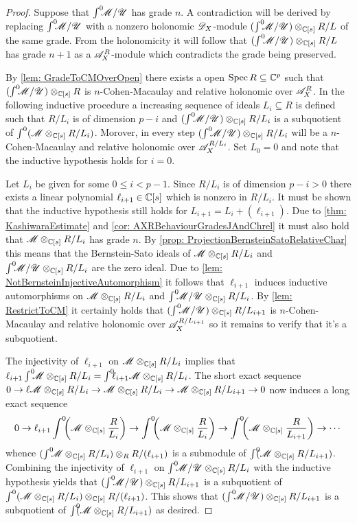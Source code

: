 \begin{proof}
  Suppose that $\int^0 \mkern -8mu\mathscr{M}/\mathscr{U}$ has grade $n$. A contradiction will be derived by replacing $\int^0 \mkern -8mu\mathscr{M}/\mathscr{U}$ with a nonzero holonomic $\mathscr{D}_X$-module $(\int^0 \mkern -8mu\mathscr{M}/\mathscr{U})\otimes_{\mathbb{C}[s]} R/L$ of the same grade. From the holonomicity it will follow that $(\int^0 \mkern -8mu\mathscr{M}/ \mathscr{U})\otimes_{\mathbb{C}[s]} R/L$ has grade $n+1$ as a $\mathscr{A}_X^R$-module which contradicts the grade being preserved.

  By \cref{lem: GradeToCMOverOpen} there exists a open $\operatorname{Spec} R\subseteq \mathbb{C}^p$ such that $(\int^0 \mkern -8mu\mathscr{M}/\mathscr{U})\otimes_{\mathbb{C}[s]}R$ is $n$-Cohen-Macaulay and relative holonomic over $\mathscr{A}_X^R$.
  In the following inductive procedure a increasing sequence of ideals $L_{i}\subseteq R$ is defined such that $R/L_{i}$ is of dimension $p - i$ and $(\int^0 \mkern -8mu\mathscr{M}/\mathscr{U}) \otimes_{\mathbb{C}[s]} R/L_{i}$ is a subquotient of $\int^0(\mathscr{M} \otimes_{\mathbb{C}[s]} R/L_{i})$.
  Morover, in every step $(\int^0 \mkern -8mu\mathscr{M}/\mathscr{U}) \otimes_{\mathbb{C}[s]} R/L_{i}$ will be a $n$-Cohen-Macaulay and relative holonomic over $\mathscr{A}_X^{R/L_{i}}$.
  Set $L_0 = 0$ and note that the inductive hypothesis holds for $i=0$.

  Let $L_i$ be given for some $0\leq i < p-1$. Since $R/L_{i}$ is of dimension $p-i > 0$ there exists a linear polynomial $\ell_{i+1}\in \mathbb{C}[s]$ which is nonzero in $R/L_{i}$.
  It must be shown that the inductive hypothesis still holds for $L_{i+1} = L_i + (\ell_{i+1})$.
  Due to \cref{thm: KashiwaraEstimate} and \cref{cor: AXRBehaviourGradesJAndChrel} it must also hold that $\mathscr{M} \otimes_{\mathbb{C}[s]} R/L_{i}$ has grade $n$.
  By \cref{prop: ProjectionBernsteinSatoRelativeChar} this means that the Bernstein-Sato ideals of $\mathscr{M} \otimes_{\mathbb{C}[s]} R/L_{i}$ and $\int^0 \mkern -8mu\mathscr{M}/\mathscr{U} \otimes_{\mathbb{C}[s]} R/L_{i}$ are the zero ideal.
  Due to \cref{lem: NotBernsteinInjectiveAutomorphism} it follows that $\ell_{i+1}$ induces inductive automorphisms on $\mathscr{M} \otimes_{\mathbb{C}[s]} R/L_{i}$ and $\int^0 \mkern -8mu\mathscr{M}/\mathscr{U} \otimes_{\mathbb{C}[s]} R/L_{i}$.
  By \cref{lem: RestrictToCM} it certainly holds that $(\int^0 \mkern -8mu\mathscr{M}/\mathscr{U}) \otimes_{\mathbb{C}[s]} R/L_{i+1}$ is $n$-Cohen-Macaulay and relative holonomic over $\mathscr{A}_X^{R/L_{i+1}}$ so it remains to verify that it's a subquotient.

  The injectivity of $\ell_{i+1}$ on $\mathscr{M} \otimes_{\mathbb{C}[s]} R/L_{i}$ implies that $\ell_{i+1}\int^0 \mkern -8mu \mathscr{M} \otimes_{\mathbb{C}[s]} R/L_{i} = \int^0 \mkern -8mu \ell_{i+1}\mathscr{M}\otimes_{\mathbb{C}[s]} R/L_{i}$.
  The short exact sequence $0\to \ell\mathscr{M} \otimes_{\mathbb{C}[s]} R/L_{i} \to \mathscr{M} \otimes_{\mathbb{C}[s]} R/L_{i} \to \mathscr{M} \otimes_{\mathbb{C}[s]} R/L_{i+1} \to 0 $ now induces a long exact sequence
  $$0 \to \ell_{i+1}\int^0 \mkern -8mu \left(\mathscr{M} \otimes_{\mathbb{C}[s]} \frac{R}{L_{i}}\right) \to \int^0 \mkern -8mu \left(\mathscr{M} \otimes_{\mathbb{C}[s]} \frac{R}{L_{i}}\right) \to \int^0 \mkern -8mu\left(\mathscr{M} \otimes_{\mathbb{C}[s]} \frac{R}{L_{i+1}}\right) \to \cdots $$
  whence $(\int^0 \mkern -8mu \mathscr{M} \otimes_{\mathbb{C}[s]} R/L_{i})\otimes_{R} R/(\ell_{i+1})$ is a submodule of $\int^0 \mkern -8mu (\mathscr{M} \otimes_{\mathbb{C}[s]} R/L_{i+1})$.
  Combining the injectivity of $\ell_{i+1}$ on $\int^0 \mkern -8mu\mathscr{M}/\mathscr{U} \otimes_{\mathbb{C}[s]} R/L_{i}$ with the inductive hypothesis yields that $(\int^0 \mkern -8mu\mathscr{M}/\mathscr{U}) \otimes_{\mathbb{C}[s]} R/L_{i+1}$ is a subquotient of $\int^0(\mathscr{M} \otimes_{\mathbb{C}[s]} R/L_{i})\otimes_{\mathbb{C}[s]} R/{(\ell_{i+1})}$.
  This shows that $(\int^0 \mkern -8mu\mathscr{M}/\mathscr{U}) \otimes_{\mathbb{C}[s]} R/L_{i+1}$ is a subquotient of $\int^0 \mkern -8mu (\mathscr{M} \otimes_{\mathbb{C}[s]} R/L_{i+1})$ as desired.


\end{proof}
